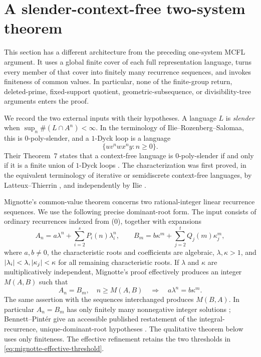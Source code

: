 \section{A slender-context-free two-system theorem}
\label{sec:slender-cobham}

This section has a different architecture from the preceding one-system
MCFL argument. It uses a global finite cover of each full representation
language, turns every member of that cover into finitely many recurrence
sequences, and invokes finiteness of common values. In particular, none of
the finite-group return, deleted-prime, fixed-support quotient,
geometric-subsequence, or divisibility-tree arguments enters the proof.

We record the two external inputs with their hypotheses. A language \(L\)
is \emph{slender} when
\(\sup_n\#(L\cap A^n)<\infty\). In the terminology of
Ilie--Rozenberg--Salomaa, this is \(0\)-poly-slender, and a \(1\)-Dyck loop
is a language
\[
  \{u v^n w x^n y:n\ge0\}.
\]
Their Theorem~7 states that a context-free language is \(0\)-poly-slender
if and only if it is a finite union of \(1\)-Dyck loops
\cite[Theorem~7]{IlieRozenbergSalomaa2000}. The characterization was first
proved, in the equivalent terminology of iterative or semidiscrete
context-free languages, by Latteux--Thierrin
\cite{LatteuxThierrin1983}, and independently by Ilie
\cite{Ilie1994}.

Mignotte's common-value theorem concerns two rational-integer linear
recurrence sequences. We use the following precise dominant-root form. The
input consists of ordinary recurrences indexed from (0), together with
expansions
\[
  A_n=a\lambda^n+\sum_{i=2}^s P_i(n)\lambda_i^n,
  \qquad
  B_m=b\kappa^m+\sum_{j=2}^t Q_j(m)\kappa_j^m,
\]
where \(a,b\ne0\), the characteristic roots and coefficients are
algebraic, \(\lambda,\kappa>1\), and
\(
  \lvert \lambda_i \rvert<\lambda,
  \lvert \kappa_j \rvert<\kappa
\)
for all remaining characteristic roots. If \(\lambda\) and \(\kappa\)
are multiplicatively independent, Mignotte's proof effectively produces an
integer \(M(A,B)\) such that
\begin{equation}
  A_n=B_m,\quad n\ge M(A,B)
  \quad\Longrightarrow\quad
  a\lambda^n=b\kappa^m.
  \label{eq:mignotte-effective-threshold}
\end{equation}
The same assertion with the sequences interchanged produces \(M(B,A)\).
In particular \(A_n=B_m\) has only finitely many nonnegative integer
solutions \cite{Mignotte1978Intersection}; Bennett--Pint\'er give an
accessible published restatement of the integral-recurrence,
unique-dominant-root hypotheses \cite{BennettPinter2015}. The qualitative
theorem below uses only finiteness. The effective refinement retains the two
thresholds in \eqref{eq:mignotte-effective-threshold}.

